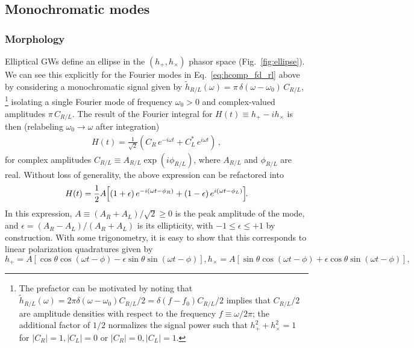 \documentclass[aps,prd,twocolumn,superscriptaddress,preprintnumbers,floatfix,nofootinbib]{revtex4-2}
\newcommand{\beq}{\begin{equation}}
\newcommand{\eeq}{\end{equation}}
\begin{document}
\subsection{Monochromatic modes}
\label{sec:ellip:mono}

\subsubsection{Morphology}

Elliptical GWs define an ellipse in the $\left(h_+, h_\times\right)$ phasor space (Fig.~\ref{fig:ellipse}).
We can see this explicitly for the Fourier modes in Eq.~\eqref{eq:hcomp_fd_rl} above by considering a monochromatic signal given by $\tilde{h}_{R/L}(\omega) = \pi\, \delta(\omega-\omega_0)\, C_{R/L} $,%
\footnote{The prefactor can be motivated by noting that $\tilde{h}_{R/L}(\omega) = 2\pi \delta(\omega - \omega_0) C_{R/L}/2 = \delta(f - f_0) C_{R/L} / 2$ implies that $C_{R/L}/2$ are amplitude densities with respect to the frequency $f \equiv \omega/2\pi$; the additional factor of $1/2$ normalizes the signal power such that $h_+^2 + h_\times^2 = 1$ for $|C_R|=1, |C_L|=0$ or $|C_R|=0, |C_L|=1$.}
isolating a single Fourier mode of frequency $\omega_0 >0$ and complex-valued amplitudes $\pi\, C_{R/L}$.
The result of the Fourier integral for $H(t) \equiv h_+ - i h_\times$ is then (relabeling $\omega_0 \to \omega$ after integration)
\begin{align} \label{eq:ellip_circ}
H(t) =\frac{1}{\sqrt{2}} \left( C_R\, e^{-i \omega t} + C^*_L\, e^{i\omega t}\right)\, ,
\end{align}
for complex amplitudes $C_{R/L} \equiv A_{R/L} \exp(i\phi_{R/L})$, where $A_{R/L}$ and $\phi_{R/L}$ are real.
Without loss of generality, the above expression can be refactored into
\begin{align}
H(t) = \frac{1}{2}A\hspace{-2pt}\left[ \left(1+\epsilon\right) e^{-i (\omega t - \phi_R)} + \left(1-\epsilon\right) e^{i (\omega t - \phi_L)} \right]\hspace{-3pt} .
\end{align}
In this expression, 
$A \equiv (A_R + A_L)/ \sqrt{2} \geq 0$ is the peak amplitude of the mode, and $\epsilon = (A_R - A_L)/(A_R + A_L)$ is its ellipticity, with $-1 \leq \epsilon \leq +1$ by construction.
With some trigonometry, it is easy to show that this corresponds to linear polarization quadratures given by
\begin{subequations} \label{eq:hcomp_ellip}
\beq
h_+ = A \left[\cos \theta \cos(\omega t - \phi) - \epsilon \sin \theta \sin(\omega t - \phi)\right] ,
\eeq
\beq
h_\times = A \left[\sin \theta \cos(\omega t - \phi) + \epsilon \cos \theta \sin(\omega t - \phi)\right] ,
\eeq
\end{subequations}
\end{document}
